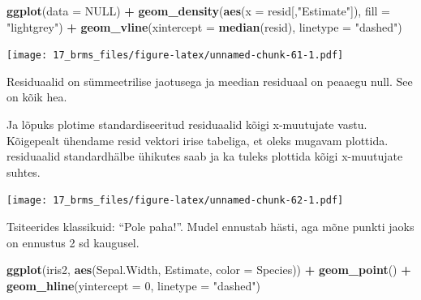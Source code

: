 \documentclass[]{book}
\newenvironment{Shaded}{\begin{snugshade}}{\end{snugshade}}
\newcommand{\DataTypeTok}[1]{\textcolor[rgb]{0.13,0.29,0.53}{#1}}
\newcommand{\DecValTok}[1]{\textcolor[rgb]{0.00,0.00,0.81}{#1}}
\newcommand{\KeywordTok}[1]{\textcolor[rgb]{0.13,0.29,0.53}{\textbf{#1}}}
\newcommand{\NormalTok}[1]{#1}
\newcommand{\OperatorTok}[1]{\textcolor[rgb]{0.81,0.36,0.00}{\textbf{#1}}}
\newcommand{\OtherTok}[1]{\textcolor[rgb]{0.56,0.35,0.01}{#1}}
\newcommand{\StringTok}[1]{\textcolor[rgb]{0.31,0.60,0.02}{#1}}
\begin{document}
\begin{Shaded}
\begin{Highlighting}[]
\KeywordTok{ggplot}\NormalTok{(}\DataTypeTok{data =} \OtherTok{NULL}\NormalTok{) }\OperatorTok{+}\StringTok{ }
\StringTok{  }\KeywordTok{geom_density}\NormalTok{(}\KeywordTok{aes}\NormalTok{(}\DataTypeTok{x =}\NormalTok{ resid[,}\StringTok{"Estimate"}\NormalTok{]), }\DataTypeTok{fill =} \StringTok{"lightgrey"}\NormalTok{) }\OperatorTok{+}\StringTok{ }
\StringTok{  }\KeywordTok{geom_vline}\NormalTok{(}\DataTypeTok{xintercept =} \KeywordTok{median}\NormalTok{(resid), }\DataTypeTok{linetype =} \StringTok{"dashed"}\NormalTok{)}
\end{Highlighting}
\end{Shaded}

\texttt{[image: 17\_brms\_files/figure-latex/unnamed-chunk-61-1.pdf]}

Residuaalid on sümmeetrilise jaotusega ja meedian residuaal on peaaegu null. See on kõik hea.

Ja lõpuks plotime standardiseeritud residuaalid kõigi x-muutujate vastu. Kõigepealt ühendame resid vektori irise tabeliga, et oleks mugavam plottida.
residuaalid standardhälbe ühikutes saab ja ka tuleks plottida kõigi x-muutujate suhtes.

\begin{Shaded}
\end{Shaded}

\texttt{[image: 17\_brms\_files/figure-latex/unnamed-chunk-62-1.pdf]}

Tsiteerides klassikuid: ``Pole paha!''. Mudel ennustab hästi, aga mõne punkti jaoks on ennustus 2 sd kaugusel.

\begin{Shaded}
\begin{Highlighting}[]
\KeywordTok{ggplot}\NormalTok{(iris2, }\KeywordTok{aes}\NormalTok{(Sepal.Width, Estimate, }\DataTypeTok{color =}\NormalTok{ Species)) }\OperatorTok{+}\StringTok{ }
\StringTok{  }\KeywordTok{geom_point}\NormalTok{() }\OperatorTok{+}
\StringTok{  }\KeywordTok{geom_hline}\NormalTok{(}\DataTypeTok{yintercept =} \DecValTok{0}\NormalTok{, }\DataTypeTok{linetype =} \StringTok{"dashed"}\NormalTok{)}
\end{Highlighting}
\end{Shaded}
\end{document}
